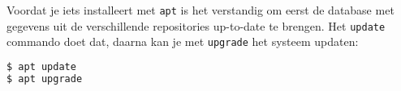 Voordat je iets installeert met \texttt{apt} is het verstandig om eerst de database met gegevens uit de verschillende repositories up-to-date te brengen. Het \texttt{update} commando doet dat, daarna kan je met \texttt{upgrade} het systeem updaten:
\begin{lstlisting}[language=bash]
$ apt update
$ apt upgrade
\end{lstlisting}

